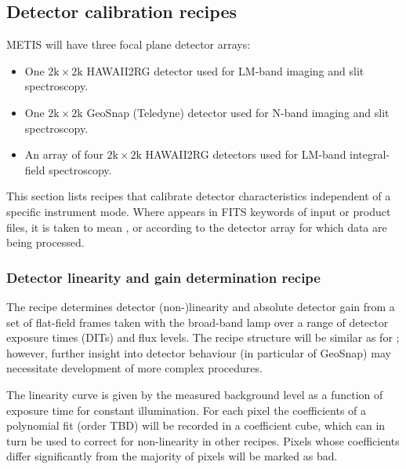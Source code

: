 \subsection{Detector calibration recipes}
\label{Sec:detector_calibration}

METIS will have three focal plane detector arrays:
\begin{itemize}
\item One $2\mathrm{k}\times 2\mathrm{k}$ HAWAII2RG detector used for
  LM-band imaging and slit spectroscopy.
\item One $2\mathrm{k}\times 2\mathrm{k}$ GeoSnap (Teledyne) detector
  used for N-band imaging and slit spectroscopy.
\item An array of four $2\mathrm{k}\times 2\mathrm{k}$ HAWAII2RG
  detectors used for LM-band integral-field spectroscopy.
\end{itemize}
This section lists recipes that calibrate detector characteristics
independent of a specific instrument mode. Where  appears
in FITS keywords of input or product files, it is taken to mean
,  or  according to the detector
array for which data are being processed.

\subsubsection{Detector linearity and gain determination recipe }
\label{sssec:metis_det_lingain}
\label{rec:metis_det_lingain}
\label{rec:metisdetlingain}

The recipe  determines detector (non-)linearity and absolute detector
gain from a set of flat-field frames taken with the broad-band lamp
over a range of detector exposure times (DITs) and flux levels. The
recipe structure will be similar as for  %
\cite{detmon-manual}; however, further insight into detector behaviour
(in particular of GeoSnap) may necessitate development of more complex
procedures.

The linearity curve is given by the measured background level as a
function of exposure time for constant illumination. For each pixel
the coefficients of a polynomial fit (order TBD) will be recorded in a
coefficient cube, which can in turn be used to correct for
non-linearity in other recipes. Pixels whose coefficients differ
significantly from the majority of pixels will be marked as bad.

